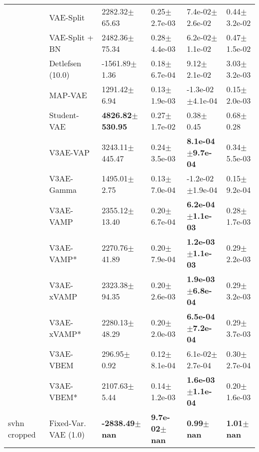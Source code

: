 \begin{tabular}{llllll}
             & VAE-Split &            2282.32$\pm$65.63 &              0.25$\pm$2.7e-03 &           7.4e-02$\pm$2.6e-02 &              0.44$\pm$3.2e-02 \\
             & VAE-Split + BN &            2482.36$\pm$75.34 &              0.28$\pm$4.4e-03 &           6.2e-02$\pm$1.1e-02 &              0.47$\pm$1.5e-02 \\
             & Detlefsen (10.0) &            -1561.89$\pm$1.36 &              0.18$\pm$6.7e-04 &              9.12$\pm$2.1e-02 &              3.03$\pm$3.2e-03 \\
             & MAP-VAE &             1291.42$\pm$6.94 &              0.13$\pm$1.9e-03 &          -1.3e-02$\pm$4.1e-04 &              0.15$\pm$2.0e-03 \\
             & Student-VAE &  \textbf{4826.82$\pm$530.95} &              0.27$\pm$1.7e-02 &                 0.38$\pm$0.45 &                 0.68$\pm$0.28 \\
             & V3AE-VAP &           3243.11$\pm$445.47 &              0.24$\pm$3.5e-03 &  \textbf{8.1e-04$\pm$9.7e-04} &              0.34$\pm$5.5e-03 \\
             & V3AE-Gamma &             1495.01$\pm$2.75 &              0.13$\pm$7.0e-04 &          -1.2e-02$\pm$1.9e-04 &              0.15$\pm$9.2e-04 \\
             & V3AE-VAMP &            2355.12$\pm$13.40 &              0.20$\pm$6.7e-04 &  \textbf{6.2e-04$\pm$1.1e-03} &              0.28$\pm$1.7e-03 \\
             & V3AE-VAMP* &            2270.76$\pm$41.89 &              0.20$\pm$7.9e-04 &  \textbf{1.2e-03$\pm$1.1e-03} &              0.29$\pm$2.2e-03 \\
             & V3AE-xVAMP &            2323.38$\pm$94.35 &              0.20$\pm$2.6e-03 &  \textbf{1.9e-03$\pm$6.8e-04} &              0.29$\pm$3.2e-03 \\
             & V3AE-xVAMP* &            2280.13$\pm$48.29 &              0.20$\pm$2.0e-03 &  \textbf{6.5e-04$\pm$7.2e-04} &              0.29$\pm$3.7e-03 \\
             & V3AE-VBEM &              296.95$\pm$0.92 &              0.12$\pm$8.1e-04 &           6.1e-02$\pm$2.7e-04 &              0.30$\pm$2.7e-04 \\
             & V3AE-VBEM* &             2107.63$\pm$5.44 &              0.14$\pm$1.2e-03 &  \textbf{1.6e-03$\pm$1.1e-04} &              0.20$\pm$1.6e-03 \\
svhn cropped & Fixed-Var. VAE (1.0) &    \textbf{-2838.49$\pm$nan} &      \textbf{9.7e-02$\pm$nan} &         \textbf{0.99$\pm$nan} &         \textbf{1.01$\pm$nan} \\

\end{tabular}
